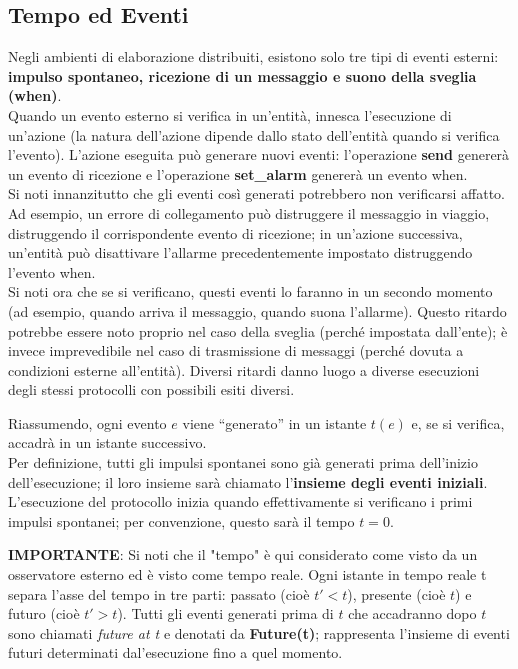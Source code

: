 \subsection{Tempo ed Eventi}
Negli ambienti di elaborazione distribuiti, esistono solo tre tipi di eventi
esterni: \textbf{impulso spontaneo, ricezione di un messaggio e suono della
    sveglia (when)}.\\
Quando un evento esterno si verifica in un'entità, innesca l'esecuzione di
un'azione (la natura dell'azione dipende dallo stato dell'entità quando si
verifica l'evento). L'azione eseguita può generare nuovi eventi: l'operazione
\textbf{send} genererà un evento di ricezione e l'operazione \textbf{set\_alarm}
genererà un evento when.\\
Si noti innanzitutto che gli eventi così generati potrebbero non verificarsi
affatto. Ad esempio, un errore di collegamento può distruggere il messaggio in
viaggio, distruggendo il corrispondente evento di ricezione; in un'azione
successiva, un'entità può disattivare l'allarme precedentemente impostato
distruggendo l'evento when.\\
Si noti ora che se si verificano, questi eventi lo faranno in un secondo momento
(ad esempio, quando arriva il messaggio, quando suona l'allarme). Questo ritardo
potrebbe essere noto proprio nel caso della sveglia (perché impostata
dall'ente); è invece imprevedibile nel caso di trasmissione di messaggi (perché
dovuta a condizioni esterne all'entità). Diversi ritardi danno luogo a diverse
esecuzioni degli stessi protocolli con possibili esiti diversi.

Riassumendo, ogni evento $e$ viene “generato” in un istante $t(e)$ e, se si
verifica, accadrà in un istante successivo.\\
Per definizione, tutti gli impulsi spontanei sono già generati prima dell'inizio
dell'esecuzione; il loro insieme sarà chiamato l'\textbf{insieme degli eventi
    iniziali}. L'esecuzione del protocollo inizia quando effettivamente si
verificano i primi impulsi spontanei; per convenzione, questo sarà il tempo $t =
    0$.

\textbf{IMPORTANTE}: Si noti che il "tempo" è qui considerato come visto da un
osservatore esterno ed è visto come tempo reale. Ogni istante in tempo reale t
separa l'asse del tempo in tre parti: passato (cioè {$t' < t$}), presente (cioè
$t$) e futuro (cioè {$t' > t$}). Tutti gli eventi generati prima di $t$ che
accadranno dopo $t$ sono chiamati \textit{future at t} e denotati da
\textbf{Future(t)}; rappresenta l'insieme di eventi futuri determinati
dal'esecuzione fino a quel momento.

